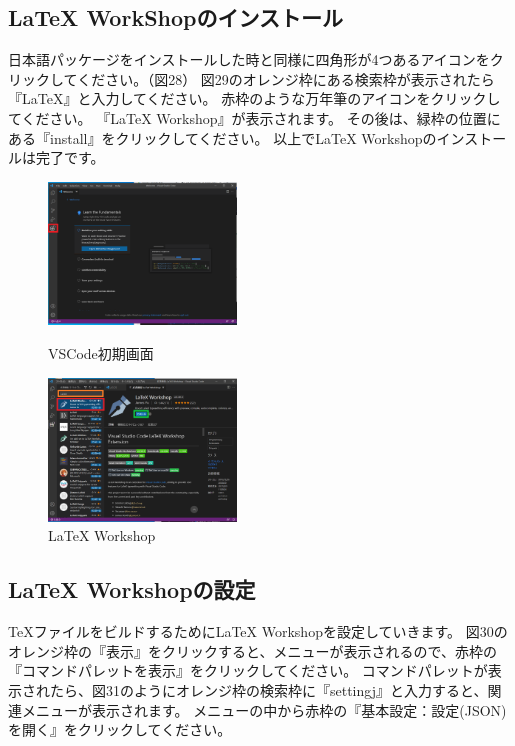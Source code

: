 \documentclass[dvipdfmx]{jsarticle}
\begin{document}
\subsection{LaTeX WorkShopのインストール}

日本語パッケージをインストールした時と同様に四角形が4つあるアイコンをクリックしてください。（図28）
図29のオレンジ枠にある検索枠が表示されたら『LaTeX』と入力してください。
赤枠のような万年筆のアイコンをクリックしてください。
『LaTeX Workshop』が表示されます。
その後は、緑枠の位置にある『install』をクリックしてください。
以上でLaTeX Workshopのインストールは完了です。

\begin{figure}[H]
    \begin{minipage}[b]{0.45\linewidth}
        \centering
        \includegraphics[width=5cm]{images/VSCodeExtension1.png}
        \caption{VSCode初期画面}
    \end{minipage}
    \begin{minipage}[b]{0.45\linewidth}
        \centering
        \includegraphics[width=5cm]{images/VSCodeExtension4.png}
        \caption{LaTeX Workshop}
    \end{minipage}
\end{figure}

\subsection{LaTeX Workshopの設定}

TeXファイルをビルドするためにLaTeX Workshopを設定していきます。
図30のオレンジ枠の『表示』をクリックすると、メニューが表示されるので、赤枠の『コマンドパレットを表示』をクリックしてください。
コマンドパレットが表示されたら、図31のようにオレンジ枠の検索枠に『settingj』と入力すると、関連メニューが表示されます。
メニューの中から赤枠の『基本設定：設定(JSON)を開く』をクリックしてください。
\end{document}
